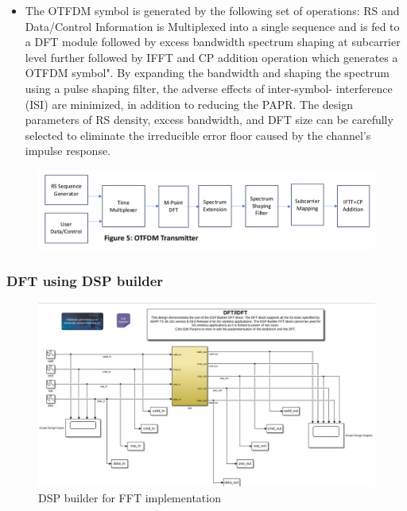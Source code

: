 \documentclass{beamer}
\begin{document}
\begin{frame}
	\begin{itemize}
		\item The OTFDM symbol is generated by the following set of operations: RS and Data/Control Information is Multiplexed into a single sequence and is fed to a DFT module followed by excess bandwidth spectrum shaping at subcarrier level further followed by IFFT and CP
addition operation which generates a OTFDM symbol". By expanding the bandwidth and
shaping the spectrum using a pulse shaping filter, the adverse effects of inter-symbol-
interference (ISI) are minimized, in addition to reducing the PAPR. The design parameters of
RS density, excess bandwidth, and DFT size can be carefully selected to eliminate the
irreducible error floor caused by the channel's impulse response.
	\end{itemize}
		\begin{figure}[h!]
		\begin{center}
    			\includegraphics[width=\linewidth]{./figs/otfdm.png}
		\label{fig:fig1}
		\end{center}
		\end{figure}
\end{frame}

\begin{frame}
	\frametitle{DFT using DSP builder}
		\begin{figure}[h!]
		\begin{center}
    			\includegraphics[width=\linewidth]{./figs/DSPBA.jpg}
		\caption{DSP builder for FFT implementation}
		\label{fig:fig1}
		\end{center}
		\end{figure}

\end{frame}
\end{document}
